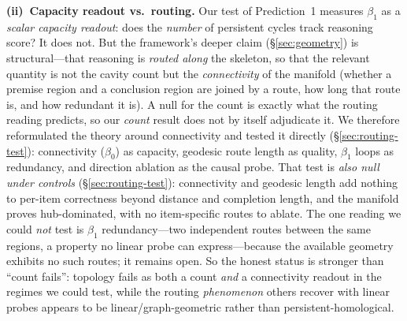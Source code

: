 \documentclass{article}
\begin{document}
\textbf{(ii)~Capacity readout vs.\ routing.} Our test of Prediction~1 measures \(\beta_1\) as a
\emph{scalar capacity readout}: does the \emph{number} of persistent cycles track reasoning score?
It does not. But the framework's deeper claim (\S\ref{sec:geometry}) is structural---that reasoning
is \emph{routed along} the skeleton, so that the relevant quantity is not the cavity count but the
\emph{connectivity} of the manifold (whether a premise region and a conclusion region are joined by a
route, how long that route is, and how redundant it is). A null for the count is exactly what the
routing reading predicts, so our \emph{count} result does not by itself adjudicate it. We therefore
reformulated the theory around connectivity and tested it directly (\S\ref{sec:routing-test}):
connectivity (\(\beta_0\)) as capacity, geodesic route length as quality, \(\beta_1\) loops as
redundancy, and direction ablation as the causal probe. That test is \emph{also null under controls}
(\S\ref{sec:routing-test}): connectivity and geodesic length add nothing to per-item correctness
beyond distance and completion length, and the manifold proves hub-dominated, with no item-specific
routes to ablate. The one reading we could \emph{not} test is \(\beta_1\) redundancy---two independent
routes between the same regions, a property no linear probe can express---because the available
geometry exhibits no such routes; it remains open. So the honest status is stronger than ``count
fails'': topology fails as both a count \emph{and} a connectivity readout in the regimes we could
test, while the routing \emph{phenomenon} others recover with linear probes
\citep{chains2dags2601,reasoningTrajectories2604} appears to be linear/graph-geometric rather than
persistent-homological.
\end{document}
